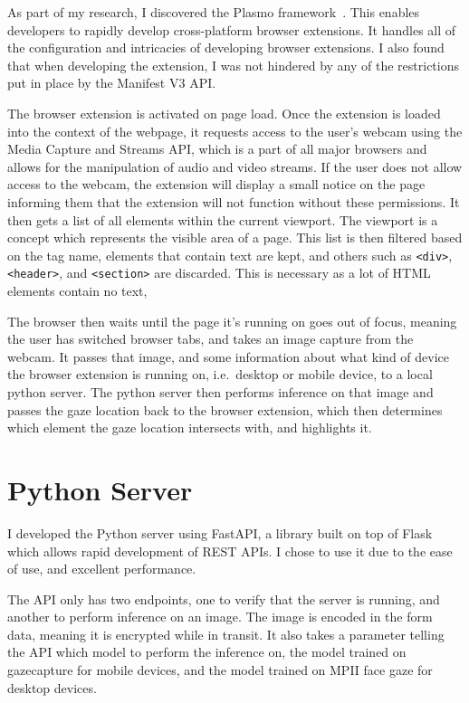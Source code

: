 \documentclass[twocolumn]{report}
\begin{document}
As part of my research, I discovered the Plasmo framework~\cite{plasmo}. This enables developers to rapidly develop cross-platform browser extensions. It handles all of the configuration and intricacies of developing browser extensions. I also found that when developing the extension, I was not hindered by any of the restrictions put in place by the Manifest V3 API.

The browser extension is activated on page load. Once the extension is loaded into the context of the webpage, it requests access to the user's webcam using the Media Capture and Streams API, which is a part of all major browsers and allows for the manipulation of audio and video streams. If the user does not allow access to the webcam, the extension will display a small notice on the page informing them that the extension will not function without these permissions. It then gets a list of all elements within the current viewport. The viewport is a concept which represents the visible area of a page. This list is then filtered based on the tag name, elements that contain text are kept, and others such as \texttt{<div>}, \texttt{<header>}, and \texttt{<section>} are discarded. This is necessary as a lot of HTML elements contain no text, 

The browser then waits until the page it's running on goes out of focus, meaning the user has switched browser tabs, and takes an image capture from the webcam. It passes that image, and some information about what kind of device the browser extension is running on, i.e.\ desktop or mobile device, to a local python server. The python server then performs inference on that image and passes the gaze location back to the browser extension, which then determines which element the gaze location intersects with, and highlights it.

\section{Python Server}

I developed the Python server using FastAPI, a library built on top of Flask which allows rapid development of REST APIs. I chose to use it due to the ease of use, and excellent performance.

The API only has two endpoints, one to verify that the server is running, and another to perform inference on an image. The image is encoded in the form data, meaning it is encrypted while in transit. It also takes a parameter telling the API which model to perform the inference on, the model trained on gazecapture for mobile devices, and the model trained on MPII face gaze for desktop devices.
\end{document}
